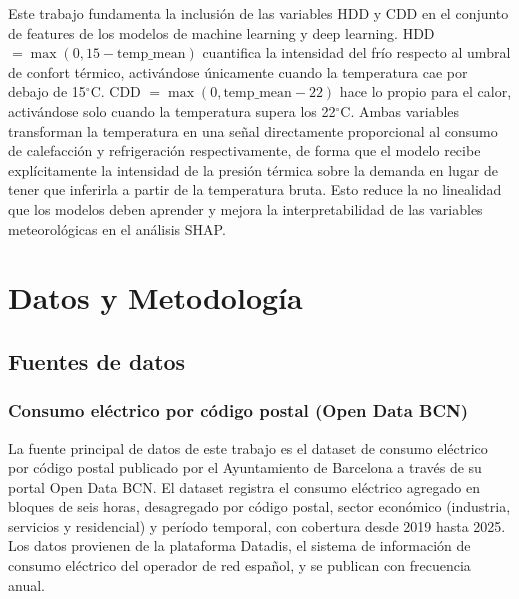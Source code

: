 \documentclass[12pt, a4paper]{article}
\begin{document}
Este trabajo fundamenta la inclusión de las variables HDD y CDD en el conjunto de features de los modelos de machine learning y deep learning. HDD $= \max(0, 15 - \text{temp\_mean})$ cuantifica la intensidad del frío respecto al umbral de confort térmico, activándose únicamente cuando la temperatura cae por debajo de 15$^\circ$C. CDD $= \max(0, \text{temp\_mean} - 22)$ hace lo propio para el calor, activándose solo cuando la temperatura supera los 22$^\circ$C. Ambas variables transforman la temperatura en una señal directamente proporcional al consumo de calefacción y refrigeración respectivamente, de forma que el modelo recibe explícitamente la intensidad de la presión térmica sobre la demanda en lugar de tener que inferirla a partir de la temperatura bruta. Esto reduce la no linealidad que los modelos deben aprender y mejora la interpretabilidad de las variables meteorológicas en el análisis SHAP.

\section{Datos y Metodología}

\subsection{Fuentes de datos}

\subsubsection{Consumo eléctrico por código postal (Open Data BCN)}

La fuente principal de datos de este trabajo es el dataset de consumo eléctrico por código postal publicado por el Ayuntamiento de Barcelona a través de su portal Open Data BCN. El dataset registra el consumo eléctrico agregado en bloques de seis horas, desagregado por código postal, sector económico (industria, servicios y residencial) y período temporal, con cobertura desde 2019 hasta 2025. Los datos provienen de la plataforma Datadis, el sistema de información de consumo eléctrico del operador de red español, y se publican con frecuencia anual.
\end{document}
